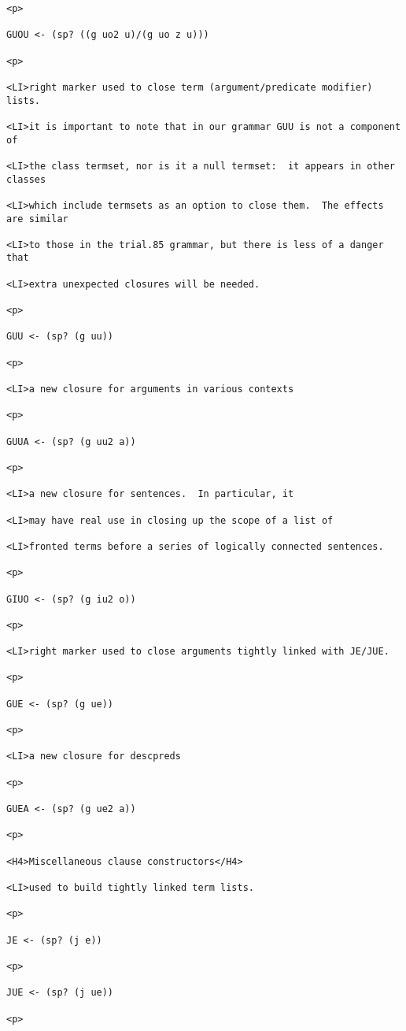 \documentclass[12pt]{article}
\begin{document}
\begin{lstlisting}
<p>

GUOU <- (sp? ((g uo2 u)/(g uo z u)))

<p>

<LI>right marker used to close term (argument/predicate modifier) lists.

<LI>it is important to note that in our grammar GUU is not a component of

<LI>the class termset, nor is it a null termset:  it appears in other classes

<LI>which include termsets as an option to close them.  The effects are similar

<LI>to those in the trial.85 grammar, but there is less of a danger that

<LI>extra unexpected closures will be needed.

<p>

GUU <- (sp? (g uu))

<p>

<LI>a new closure for arguments in various contexts

<p>

GUUA <- (sp? (g uu2 a))

<p>

<LI>a new closure for sentences.  In particular, it

<LI>may have real use in closing up the scope of a list of

<LI>fronted terms before a series of logically connected sentences.

<p>

GIUO <- (sp? (g iu2 o))

<p>

<LI>right marker used to close arguments tightly linked with JE/JUE.

<p>

GUE <- (sp? (g ue))

<p>

<LI>a new closure for descpreds

<p>

GUEA <- (sp? (g ue2 a))

<p>

<H4>Miscellaneous clause constructors</H4>

<LI>used to build tightly linked term lists.

<p>

JE <- (sp? (j e))

<p>

JUE <- (sp? (j ue))

<p>


\end{lstlisting}
\end{document}
